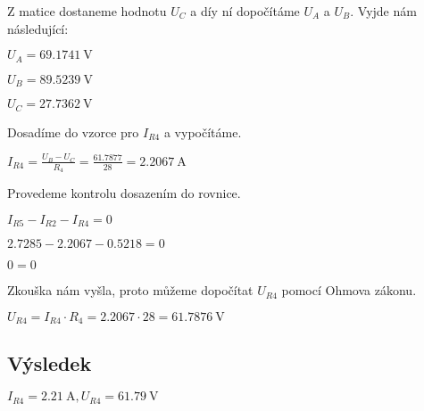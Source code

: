 \begin{large}
\vspace{1cm} \flushleft
Z matice dostaneme hodnotu $U_C$ a díy ní dopočítáme $U_A$ a $U_B$. Vyjde nám následující:
\end{large}

\vspace{0.5cm}
$U_A = 69.1741\: \si{\volt}$

\vspace{0.25cm}
$U_B = 89.5239\: \si{\volt}$

\vspace{0.25cm}
$U_C = 27.7362\: \si{\volt}$

\begin{large}
\vspace{1cm} \flushleft
Dosadíme do vzorce pro $I_{R4}$ a vypočítáme.
\end{large}

\vspace{0.5cm}
$I_{R4} = \frac{U_B - U_C}{R_4} = \frac{61.7877}{28} = 2.2067\: \si{\ampere}$

\begin{large}
\vspace{1cm} \flushleft
Provedeme kontrolu dosazením do rovnice.
\end{large}

\vspace{0.5cm}
$I_{R5} - I_{R2} - I_{R4} = 0$

\vspace{0.25cm}
$2.7285 - 2.2067 - 0.5218 = 0$

\vspace{0.25cm}
$0 = 0$

\begin{large}
\vspace{1cm}
Zkouška nám vyšla, proto můžeme dopočítat $U_{R4}$ pomocí Ohmova zákonu.
\end{large}

\vspace{0.5cm}
$U_{R4} = I_{R4} \cdot R_4 = 2.2067 \cdot 28 = 61.7876\: \si{\volt}$

\subsection{Výsledek}
$I_{R4} = 2.21\: \si{\ampere}, U_{R4} = 61.79\: \si{\volt}$